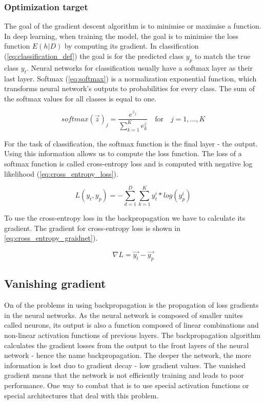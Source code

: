 \documentclass[times, utf8, diplomski]{fer}
\begin{document}
\subsubsection{Optimization target}

The goal of the gradient descent algorithm is to minimise or maximise a function. In deep learning, when training the model, the goal is to minimise the loss function $E(h|D)$ by computing its gradient. In classification (\ref{eq:classification_def}) the goal is for the predicted class $y_p$ to match the true class $y_t$. Neural networks for classification usually have a softmax layer as their last layer. Softmax (\ref{eq:softmax}) is a normalization exponential function, which transforms neural network's outputs to probabilities for every class. The sum of the softmax values for all classes is equal to one.  

\begin{equation}
\label{eq:softmax}
	softmax(\vec{z})_j = \frac{e^{z_j}}{\displaystyle\sum_{k=1}^{K} e^{z}_k} \quad \text{for} \quad j = 1, ..., K
\end{equation} 

For the task of classification, the softmax function is the final layer - the output. Using this information allows us to compute the loss function. The loss of a softmax function is called cross-entropy loss and is computed with negative log likelihood (\ref{eq:cross_entropy_loss}).

\begin{equation}
\label{eq:cross_entropy_loss}
	L(y_t, y_p) = - \displaystyle\sum_{d=1}^{D} \sum_{k=1}^{K} y^i_t * log(y^i_p) 
\end{equation}

To use the cross-entropy loss in the backpropagation we have to calculate its gradient. The gradient for cross-entropy loss is shown in \ref{eq:cross_entropy_graidnet}).

\begin{equation}
\label{eq:cross_entropy_graidnet}
 \nabla{L} = \vec{y_t} - \vec{y_p}
\end{equation}

\subsection{Vanishing gradient}
\label{se:vanishing_gradient}

On of the problems in using backpropagation is the propagation of loss gradients in the neural networks. As the neural network is composed of smaller unites called neurons, its output is also a function composed of linear combinations and non-linear activation functions of previous layers. The backpropagation algorithm calculates the gradient losses from the output to the front layers of the neural network - hence the name backpropagation. The deeper the network, the more information is lost duo to gradient decay - low gradient values. The vanished gradient means that the network is not efficiently training and leads to poor performance. One way to combat that is to use special activation functions \citep{clevert_fast_2015, xu_empirical_2015, he_delving_2015} or special architectures \citep{he_deep_2016} that deal with this problem. 
\end{document}
